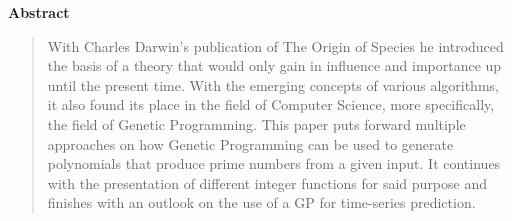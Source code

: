 \documentclass[11pt,a4paper]{article}
\renewenvironment{abstract}
   {
\centerline{\large\bf Abstract}
    \vspace{-0.1in}\begin{quote}}
       {\par\end{quote}\vskip 0.1in}
\begin{document}

\begin{abstract} 
\small
With Charles Darwin's publication of The Origin of Species he introduced the basis of a theory that would only gain in influence and importance up until the present time. With the emerging concepts of various algorithms, it also found its place in the field of Computer Science, more specifically, the field of Genetic Programming.
This paper puts forward multiple approaches on how Genetic Programming can be used to generate polynomials that produce prime numbers from a given input.
It continues with the presentation of different integer functions for said purpose and finishes with an outlook on the use of a GP for time-series prediction. 
\end{abstract} 
\end{document}

